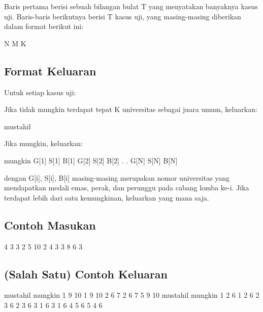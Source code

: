 \documentclass[../main_problemset.tex]{subfiles} %
\begin{document}
Baris pertama berisi sebuah bilangan bulat T yang menyatakan banyaknya kasus uji. Baris-baris berikutnya berisi T kasus uji, yang masing-masing diberikan dalam format berikut ini:

\begin{lcverbatim}
N M K
\end{lcverbatim}

\subsection*{Format Keluaran}

Untuk setiap kasus uji:

Jika tidak mungkin terdapat tepat K universitas sebagai juara umum, keluarkan:

\begin{lcverbatim}
mustahil
\end{lcverbatim}

Jika mungkin, keluarkan:

\begin{lcverbatim}
mungkin
G[1] S[1] B[1]
G[2] S[2] B[2]
.
.
G[N] S[N] B[N]
\end{lcverbatim}

\vspace{.4cm}

dengan G[i], S[i], B[i] masing-masing merupakan nomor universitas yang mendapatkan medali emas, perak, dan perunggu pada cabang lomba ke-i. Jika terdapat lebih dari satu kemungkinan, keluarkan yang mana saja.

\begin{minipage}[t]{0.5\textwidth}
\subsection*{Contoh Masukan}

\begin{lcverbatim}
4
3 3 2
5 10 2
4 3 3
8 6 3
\end{lcverbatim}
\end{minipage}
\begin{minipage}[t]{0.5\textwidth}
\subsection*{(Salah Satu) Contoh Keluaran}

\begin{lcverbatim}
mustahil
mungkin
1 9 10
1 9 10
2 6 7
2 6 7
5 9 10
mustahil
mungkin
1 2 6
1 2 6
2 3 6
2 3 6
3 1 6
3 1 6
4 5 6
5 4 6
\end{lcverbatim}
\end{minipage}
\end{document}
